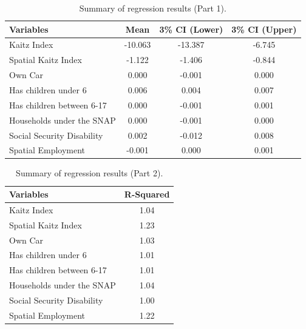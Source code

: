 \documentclass[AEJ]{AEA}
\begin{document}
\begin{table}[ht]
	\centering
	\begin{tabular}{|l|c|c|c|}
		\hline
		\textbf{Variables}         & \textbf{Mean} & \textbf{3\% CI (Lower)} & \textbf{3\% CI (Upper)} \\
		\hline
		Kaitz Index                & -10.063       & -13.387                 & -6.745                  \\
		Spatial Kaitz Index        & -1.122        & -1.406                  & -0.844                  \\
		Own Car                    & 0.000         & -0.001                  & 0.000                   \\
		Has children under 6       & 0.006         & 0.004                   & 0.007                   \\
		Has children between 6-17  & 0.000         & -0.001                  & 0.001                   \\
		Households under the SNAP  & 0.000         & -0.001                  & 0.000                   \\
		Social Security Disability & 0.002         & -0.012                  & 0.008                   \\
		Spatial Employment         & -0.001        & 0.000                   & 0.001                   \\
		\hline
	\end{tabular}
	\caption{Summary of regression results (Part 1).}
\end{table}

\begin{table}[ht]
	\centering
	\begin{tabular}{|l|c|}
		\hline
		\textbf{Variables}         & \textbf{R-Squared} \\
		\hline
		Kaitz Index                & 1.04               \\
		Spatial Kaitz Index        & 1.23               \\
		Own Car                    & 1.03               \\
		Has children under 6       & 1.01               \\
		Has children between 6-17  & 1.01               \\
		Households under the SNAP  & 1.04               \\
		Social Security Disability & 1.00               \\
		Spatial Employment         & 1.22               \\
		\hline
	\end{tabular}
	\caption{Summary of regression results (Part 2).}
\end{table}
\end{document}
